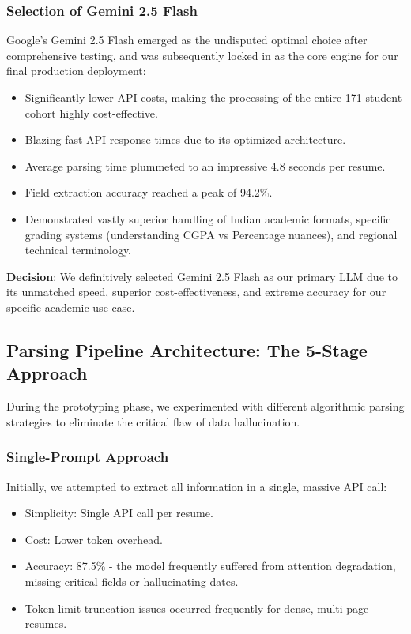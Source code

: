\documentclass[12pt,a4paper]{report}
\begin{document}
\subsubsection{Selection of Gemini 2.5 Flash}
Google's Gemini 2.5 Flash emerged as the undisputed optimal choice after comprehensive testing, and was subsequently locked in as the core engine for our final production deployment:
\begin{itemize}
    \item Significantly lower API costs, making the processing of the entire 171 student cohort highly cost-effective.
    \item Blazing fast API response times due to its optimized architecture.
    \item Average parsing time plummeted to an impressive 4.8 seconds per resume.
    \item Field extraction accuracy reached a peak of 94.2\%.
    \item Demonstrated vastly superior handling of Indian academic formats, specific grading systems (understanding CGPA vs Percentage nuances), and regional technical terminology.
\end{itemize}

\textbf{Decision}: We definitively selected Gemini 2.5 Flash as our primary LLM due to its unmatched speed, superior cost-effectiveness, and extreme accuracy for our specific academic use case.

\subsection{Parsing Pipeline Architecture: The 5-Stage Approach}

During the prototyping phase, we experimented with different algorithmic parsing strategies to eliminate the critical flaw of data hallucination.

\subsubsection{Single-Prompt Approach}
Initially, we attempted to extract all information in a single, massive API call:
\begin{itemize}
    \item Simplicity: Single API call per resume.
    \item Cost: Lower token overhead.
    \item Accuracy: 87.5\% - the model frequently suffered from attention degradation, missing critical fields or hallucinating dates.
    \item Token limit truncation issues occurred frequently for dense, multi-page resumes.
\end{itemize}
\end{document}
